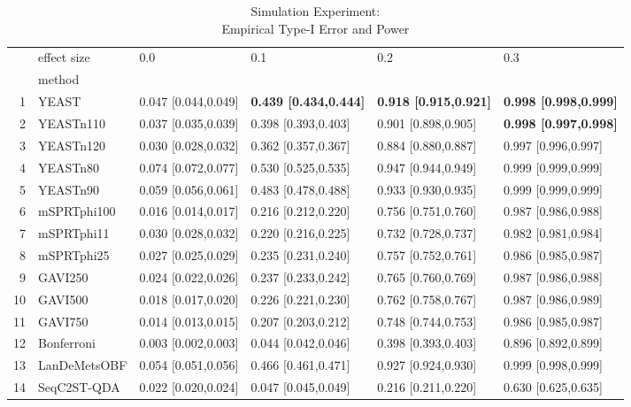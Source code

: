 \begin{table}[ht]
\caption{Simulation Experiment: \\ Empirical Type-I Error and Power}\label{tbl:mainExperiment}
\centering
\begin{footnotesize}
\setlength{\tabcolsep}{2pt}
\begin{tabular}{rlllll}
  \hline
  & effect size & 0.0 & 0.1 & 0.2 & 0.3\\
  & method & & & & \\
  \hline
  1 & YEAST & 0.047 [0.044,0.049] & \textbf{0.439 [0.434,0.444]} & \textbf{0.918 [0.915,0.921]} & \textbf{0.998 [0.998,0.999]} \\
  2 & YEASTn110 & 0.037 [0.035,0.039] & 0.398 [0.393,0.403] & 0.901 [0.898,0.905] & \textbf{0.998 [0.997,0.998]} \\
  3 & YEASTn120 & 0.030 [0.028,0.032] & 0.362 [0.357,0.367] & 0.884 [0.880,0.887] & 0.997 [0.996,0.997] \\
  4 & YEASTn80 & 0.074 [0.072,0.077] & 0.530 [0.525,0.535] & 0.947 [0.944,0.949] & 0.999 [0.999,0.999] \\
  5 & YEASTn90 & 0.059 [0.056,0.061] & 0.483 [0.478,0.488] & 0.933 [0.930,0.935] & 0.999 [0.999,0.999] \\
  6 & mSPRTphi100 & 0.016 [0.014,0.017] & 0.216 [0.212,0.220] & 0.756 [0.751,0.760] & 0.987 [0.986,0.988] \\
  7 & mSPRTphi11 & 0.030 [0.028,0.032] & 0.220 [0.216,0.225] & 0.732 [0.728,0.737] & 0.982 [0.981,0.984] \\
  8 & mSPRTphi25 & 0.027 [0.025,0.029] & 0.235 [0.231,0.240] & 0.757 [0.752,0.761] & 0.986 [0.985,0.987] \\
  9 & GAVI250 & 0.024 [0.022,0.026] & 0.237 [0.233,0.242] & 0.765 [0.760,0.769] & 0.987 [0.986,0.988] \\
  10 & GAVI500 & 0.018 [0.017,0.020] & 0.226 [0.221,0.230] & 0.762 [0.758,0.767] & 0.987 [0.986,0.989] \\
  11 & GAVI750 & 0.014 [0.013,0.015] & 0.207 [0.203,0.212] & 0.748 [0.744,0.753] & 0.986 [0.985,0.987] \\
  12 & Bonferroni & 0.003 [0.002,0.003] & 0.044 [0.042,0.046] & 0.398 [0.393,0.403] & 0.896 [0.892,0.899] \\
  13 & LanDeMetsOBF & 0.054 [0.051,0.056] & 0.466 [0.461,0.471] & 0.927 [0.924,0.930] & 0.999 [0.998,0.999] \\
  14 & SeqC2ST-QDA & 0.022 [0.020,0.024] & 0.047 [0.045,0.049] & 0.216 [0.211,0.220] & 0.630 [0.625,0.635] \\
   \hline
\end{tabular}
\end{footnotesize}
\end{table}
